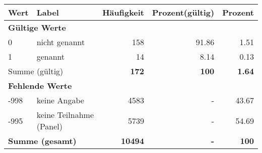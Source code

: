      \begin{longtable}{lXrrr}
     \toprule
     \textbf{Wert} & \textbf{Label} & \textbf{Häufigkeit} & \textbf{Prozent(gültig)} & \textbf{Prozent} \\
     \endhead
     \midrule
     \multicolumn{5}{l}{\textbf{Gültige Werte}}\\

     0 &
     \multicolumn{1}{X}{ nicht genannt   } &


       \num{158} &
       \num[round-mode=places,round-precision=2]{91,86} &
         \num[round-mode=places,round-precision=2]{1,51} \\

     1 &
     \multicolumn{1}{X}{ genannt   } &


       \num{14} &
       \num[round-mode=places,round-precision=2]{8,14} &
         \num[round-mode=places,round-precision=2]{0,13} \\
     \midrule
     \multicolumn{2}{l}{Summe (gültig)} &
       \textbf{\num{172}} &
     \textbf{100} &
       \textbf{\num[round-mode=places,round-precision=2]{1,64}} \\
     \multicolumn{5}{l}{\textbf{Fehlende Werte}}\\
       -998 &
       keine Angabe &
         \num{4583} &
        - &
         \num[round-mode=places,round-precision=2]{43,67} \\
       -995 &
       keine Teilnahme (Panel) &
         \num{5739} &
        - &
         \num[round-mode=places,round-precision=2]{54,69} \\
     \midrule
     \multicolumn{2}{l}{\textbf{Summe (gesamt)}} &
          \textbf{\num{10494}} &
        \textbf{-} &
        \textbf{100} \\
     \bottomrule
     \end{longtable}
     
